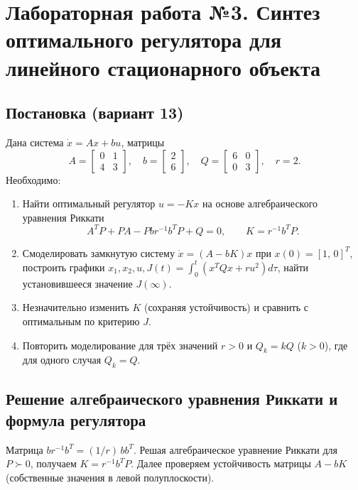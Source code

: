 \chapter{Лабораторная работа №3. Синтез оптимального регулятора для линейного стационарного объекта}

\section*{Постановка (вариант 13)}
Дана система \(\dot x = A x + b u\), матрицы
\[
A=\begin{bmatrix}0&1\\4&3\end{bmatrix},\quad b=\begin{bmatrix}2\\6\end{bmatrix},\quad Q=\begin{bmatrix}6&0\\0&3\end{bmatrix},\quad r=2.
\]
Необходимо:
\begin{enumerate}
 \item Найти оптимальный регулятор \(u=-Kx\) на основе алгебраического уравнения Риккати
 \[
  A^T P + P A - P b r^{-1} b^T P + Q = 0,\qquad K=r^{-1} b^T P.
 \]
 \item Смоделировать замкнутую систему \(\dot x=(A-bK)x\) при \(x(0)=[1,\,0]^T\), построить графики \(x_1, x_2, u, J(t)=\int_0^t (x^T Q x + r u^2)d\tau\), найти установившееся значение \(J(\infty)\).
 \item Незначительно изменить \(K\) (сохраняя устойчивость) и сравнить с оптимальным по критерию \(J\).
 \item Повторить моделирование для трёх значений \(r>0\) и \(Q_k=kQ\) (\(k>0\)), где для одного случая \(Q_k=Q\).
\end{enumerate}

\section{Решение алгебраического уравнения Риккати и формула регулятора}
Матрица \(b r^{-1} b^T = (1/r)\,b b^T\). Решая алгебраическое уравнение Риккати для \(P\succ0\), получаем \(K=r^{-1} b^T P\). Далее проверяем устойчивость матрицы \(A-bK\) (собственные значения в левой полуплоскости).

